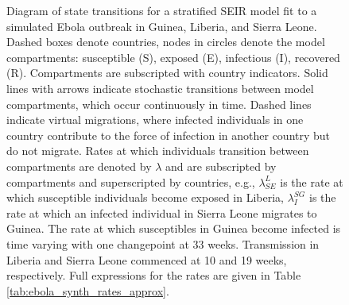 \begin{figure}[htbp]
\begin{fullpage}
{
		}
		\caption[Diagram of a stratified SEIR model with country specific outbreak dynamics and cross--country virtual transmission.]{Diagram of state transitions for a stratified SEIR model fit to a simulated Ebola outbreak in Guinea, Liberia, and Sierra Leone. Dashed boxes denote countries, nodes in circles denote the model compartments: susceptible (S), exposed (E), infectious (I), recovered (R). Compartments  are subscripted with country indicators. Solid lines with arrows indicate stochastic transitions between model compartments, which occur continuously in time. Dashed lines indicate virtual migrations, where infected individuals in one country contribute to the force of infection in another country but do not migrate. Rates at which individuals transition between compartments are denoted by $ \lambda $ and are subscripted by compartments and superscripted by countries, e.g., $ \lambda_{SE}^L $ is the rate at which susceptible individuals become exposed in Liberia, $ \lambda_I^{SG} $ is the rate at which an infected individual in Sierra Leone migrates to Guinea. The rate at which susceptibles in Guinea become infected is time varying with one changepoint at 33 weeks. Transmission in Liberia and Sierra Leone commenced at 10 and 19 weeks, respectively. Full expressions for the rates are given in Table \ref{tab:ebola_synth_rates_approx}.}
		\label{fig:stratified_seir_approx_diag}
	\end{fullpage}
\end{figure}

